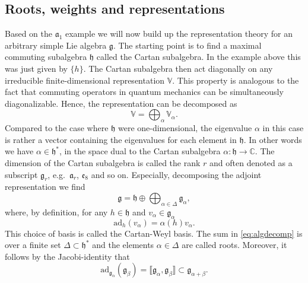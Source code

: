 \subsection{Roots, weights and representations}
Based on the $\mathfrak{a}_1$ example we will now build up the representation theory for an arbitrary simple Lie algebra $\mathfrak{g}$. The starting point is to find a maximal commuting subalgebra $\mathfrak{h}$ called the Cartan subalgebra. In the example above this was just given by $\{h\}$. The Cartan subalgebra then act diagonally on any irreducible finite-dimensional representation $\mathbb{V}$. This property is analogous to the fact that commuting operators in quantum mechanics can be simultaneously diagonalizable. Hence, the representation can be decomposed as 
\begin{equation}
    \mathbb{V} = \bigoplus_\alpha \mathbb{V}_\alpha.
\end{equation}
Compared to the case where $\mathfrak{h}$ were one-dimensional, the eigenvalue $\alpha$ in this case is rather a vector containing the eigenvalues for each element in $\mathfrak{h}$. In other words we have $\alpha\in \mathfrak{h}^*$, in the space dual to the Cartan subalgebra $\alpha:\mathfrak{h}\to \mathbb{C}$. The dimension of the Cartan subalgebra is called the rank $r$ and often denoted as a subscript $\mathfrak{g}_r$, e.g.\ $\mathfrak{a}_r$, $\mathfrak{e}_8$ and so on. Especially, decomposing the adjoint representation we find
\begin{equation}\label{eq:algdecomp}
    \mathfrak{g} = \mathfrak{h}\oplus\bigoplus_{\alpha\in\Delta} \mathfrak{g}_\alpha,
\end{equation}
where, by definition, for any $h\in\mathfrak{h}$ and $v_\alpha\in\mathfrak{g}_\alpha$ 
\begin{equation}
    \text{ad}_h(v_\alpha) = \alpha(h)v_\alpha.
\end{equation}
This choice of basis is called the Cartan-Weyl basis. The sum in \eqref{eq:algdecomp} is over a finite set $\Delta\subset\mathfrak{h}^*$ and the elements $\alpha\in\Delta$ are called roots. Moreover, it follows by the Jacobi-identity that 
\begin{equation}
    \text{ad}_{\mathfrak{g}_\alpha}(\mathfrak{g}_\beta) = \llbracket\mathfrak{g}_\alpha,\mathfrak{g}_\beta\rrbracket \subset \mathfrak{g}_{\alpha+\beta}.
\end{equation}
